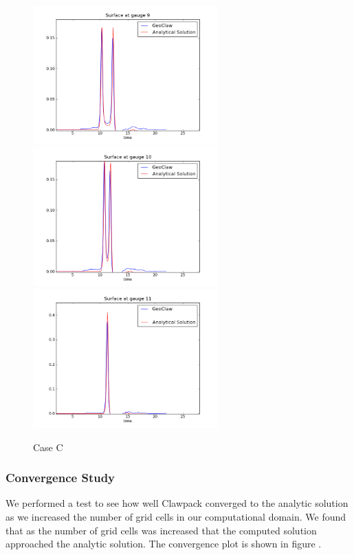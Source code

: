 \begin{figure}[ht]
\hfil\includegraphics[width=2.8in]{bp2/CaseC/gauge0009fig300.png}\hfil
\vskip 5pt
\hfil\includegraphics[width=2.8in]{bp2/CaseC/gauge0010fig300.png}\hfil
\hfil\includegraphics[width=2.8in]{bp2/CaseC/gauge0011fig300.png}\hfil
\caption{\label{fig:bp2C} Case C }
\end{figure}

\subsubsection{Convergence Study}
We performed a test to see how well Clawpack converged to the analytic solution as we increased the number of grid cells in our computational domain.  We found that as the number of grid cells was increased that the computed solution approached the analytic solution.  The convergence plot is shown in figure .

